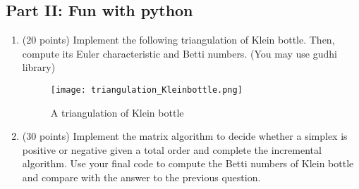 \documentclass{exam}
\begin{document}
\newpage

\subsection*{Part II: Fun with python}

\begin{enumerate}
    \item (20 points) Implement the following triangulation of Klein bottle. Then, compute its Euler characteristic and Betti numbers. (You may use gudhi library)

\begin{figure}[ht]
    \centering
    \texttt{[image: triangulation\_Kleinbottle.png]}
    \caption{A triangulation of Klein bottle}
    \label{fig:klein}
\end{figure}


    \item (30 points) Implement the matrix algorithm to decide whether a simplex is positive or negative given a total order and complete the incremental algorithm. Use your final code to compute the Betti numbers of Klein bottle and compare with the answer to the previous question. 
\end{enumerate}
\end{document}

